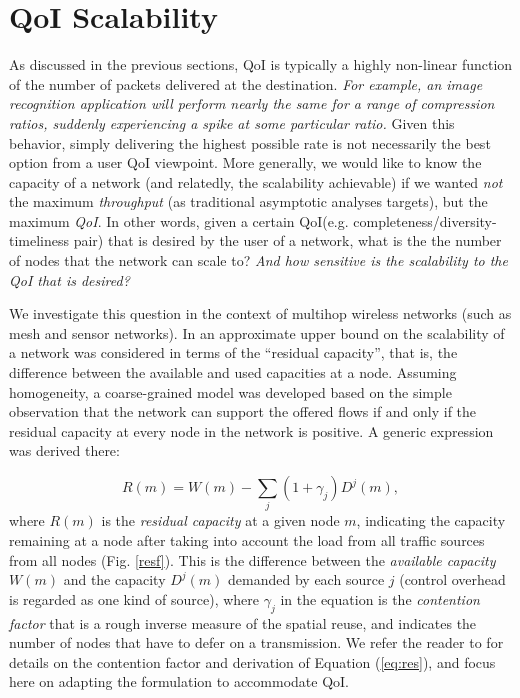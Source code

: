 
\section{QoI Scalability}
\label{sec:qoi_scalability}

As discussed in the previous sections, QoI %
is typically a highly
non-linear function of the number of packets delivered at the
destination.  \emph{For example, an image recognition application will
perform nearly the same for a range of compression ratios, suddenly
experiencing a spike at some particular ratio.} Given this behavior, simply
delivering the highest possible rate is not necessarily the best
option from a user QoI viewpoint. More generally, we would like to know
the capacity of a network (and relatedly, the scalability achievable)
if we wanted {\em not} the maximum {\em throughput} (as traditional
asymptotic analyses targets), but the maximum {\em QoI}. In other
words, given a certain QoI(e.g. completeness/diversity-timeliness pair) that is desired by the  user of a network,
what is the the number of nodes that the network can scale to?\emph{ And how
sensitive is the scalability to the QoI that is desired?}

We investigate this question in the context of multihop wireless networks
(such as mesh and sensor networks).
In \cite{scalability_manets_theory_vs_practice} an approximate upper bound on the
 scalability of a network was
considered in terms of the ``residual capacity'', that is, the difference
between the available and used capacities at a node. Assuming homogeneity, a
coarse-grained model was developed based on the simple observation
that the network can support the offered flows if and only if the
residual capacity at every node in the network is positive.  A generic
expression was derived there:


\begin{equation}
R(m) = W(m) - \sum_j (1+\gamma_j)D^j(m),
\label{eq:res}
\end{equation}
where $R(m)$ is the {\em residual capacity} at a given node $m$, indicating
the capacity remaining at a node after taking into account the load
from all traffic sources from all nodes (Fig. \ref{resf}). This is the difference
between the {\em available capacity} $W(m)$  and the capacity $D^j(m)$
demanded by
each source $j$ (control overhead is regarded as one kind of
source), where $\gamma_j$ in the equation is the {\em contention factor} that is a rough inverse
measure of the spatial reuse, and indicates the number of  nodes that have
to defer on a transmission.
We refer the reader to \cite{scalability_manets_theory_vs_practice} for details on the contention factor
and derivation of Equation (\ref{eq:res}), and focus here on adapting the
formulation to accommodate QoI.

